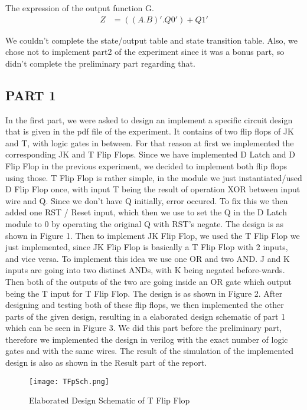 \documentclass[pdftex,12pt,a4paper]{article}
\begin{document}
The expression of the output function G.
\begin{align*}
Z &= ((A.B)' . Q0') + Q1'
\end{align*}

We couldn't complete the state/output table and state transition table. Also, we chose not to implement part2 of the experiment since it was a bonus part, so didn't complete the preliminary part regarding that.


\subsection{PART 1}
In the first part, we were asked to design an implement a specific circuit design that is given in the pdf file of the experiment. It contains of two flip flops of JK and T, with logic gates in between. For that reason at first we implemented the corresponding JK and T Flip Flops. Since we have implemented D Latch and D Flip Flop in the previous experiment, we decided to implement both flip flops using those.  T Flip Flop is rather simple, in the module we just instantiated/used D Flip Flop once, with input T being the result of operation XOR between input wire and Q. Since we don't have Q initially, error occured. To fix this we then added one RST / Reset input, which then we use to set the Q in the D Latch module to 0 by operating the original Q with RST's negate. The design is as shown in Figure 1. Then to implement JK Flip Flop, we used the T Flip Flop we just implemented, since JK Flip Flop is basically a T Flip Flop with 2 inputs, and vice versa. To implement this idea we use one OR and two AND. J and K inputs are going into two distinct ANDs, with K being negated before-wards. Then both of the outputs of the two are going inside an OR gate which output being the T input for T Flip Flop. The design is as shown in Figure 2. After designing and testing both of these flip flops, we then implemented the other parts of the given design, resulting in a elaborated design schematic of part 1 which can be seen in Figure 3. We did this part before the preliminary part, therefore we implemented the design in verilog with the exact number of logic gates and with the same wires. The result of the simulation of the implemented design is also as shown in the Result part of the report.

\begin{figure}[ht]
	\centering
	\texttt{[image: TFpSch.png]}
	\caption{Elaborated Design Schematic of T Flip Flop}
	\label{fig1}
\end{figure}
\end{document}
